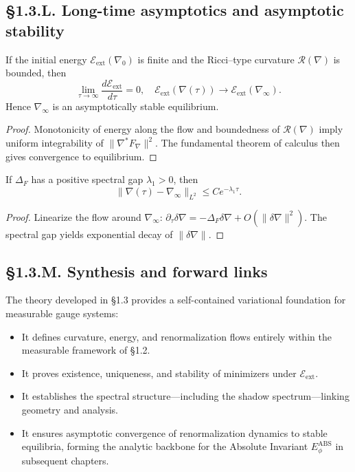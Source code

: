 \subsection*{§1.3.L. Long-time asymptotics and asymptotic stability}

\begin{theorem}\label{thm:1.3.stability}
If the initial energy $\mathcal E_{\mathrm{ext}}(\nabla_0)$ is finite and the Ricci–type curvature $\mathcal R(\nabla)$ is bounded, then
\[
\lim_{\tau\to\infty} \frac{d\mathcal E_{\mathrm{ext}}}{d\tau}=0,\quad
\mathcal E_{\mathrm{ext}}(\nabla(\tau))\to \mathcal E_{\mathrm{ext}}(\nabla_\infty).
\]
Hence $\nabla_\infty$ is an asymptotically stable equilibrium.
\end{theorem}

\begin{proof}
Monotonicity of energy along the flow and boundedness of $\mathcal R(\nabla)$ imply uniform integrability of $\|\nabla^\ast F_\nabla\|^2$.  
The fundamental theorem of calculus then gives convergence to equilibrium.
\end{proof}

\begin{lemma}
If $\Delta_F$ has a positive spectral gap $\lambda_1>0$, then
\[
\|\nabla(\tau)-\nabla_\infty\|_{L^2}\le 
Ce^{-\lambda_1\tau}.
\]
\end{lemma}

\begin{proof}
Linearize the flow around $\nabla_\infty$:
$\partial_\tau \delta\nabla = -\Delta_F\delta\nabla + O(\|\delta\nabla\|^2)$.  
The spectral gap yields exponential decay of $\|\delta\nabla\|$.
\end{proof}

\subsection*{§1.3.M. Synthesis and forward links}

The theory developed in §1.3 provides a self-contained variational foundation for measurable gauge systems:

\begin{itemize}
  \item It defines curvature, energy, and renormalization flows entirely within the measurable framework of §1.2.
  \item It proves existence, uniqueness, and stability of minimizers under $\mathcal E_{\mathrm{ext}}$.
  \item It establishes the spectral structure—including the shadow spectrum—linking geometry and analysis.
  \item It ensures asymptotic convergence of renormalization dynamics to stable equilibria, forming the analytic backbone for the Absolute Invariant $E_\phi^{\mathrm{ABS}}$ in subsequent chapters.
\end{itemize}

